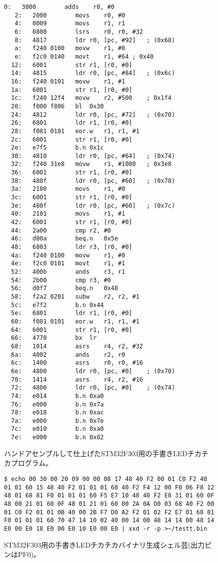 \documentclass[uplatex]{jsarticle}
\begin{document}
\begin{figure}[H]
\begin{lstlisting}[style=armasm]
   0:	3000      	adds	r0, #0
   2:	2000      	movs	r0, #0
   4:	0009      	movs	r1, r1
   6:	0800      	lsrs	r0, r0, #32
   8:	4817      	ldr	r0, [pc, #92]	; (0x68)
   a:	f240 0100 	movw	r1, #0
   e:	f2c0 0140 	movt	r1, #64	; 0x40
  12:	6001      	str	r1, [r0, #0]
  14:	4815      	ldr	r0, [pc, #84]	; (0x6c)
  16:	f240 0101 	movw	r1, #1
  1a:	6001      	str	r1, [r0, #0]
  1c:	f240 12f4 	movw	r2, #500	; 0x1f4
  20:	f000 f806 	bl	0x30
  24:	4812      	ldr	r0, [pc, #72]	; (0x70)
  26:	6801      	ldr	r1, [r0, #0]
  28:	f081 0101 	eor.w	r1, r1, #1
  2c:	6001      	str	r1, [r0, #0]
  2e:	e7f5      	b.n	0x1c
  30:	4810      	ldr	r0, [pc, #64]	; (0x74)
  32:	f240 31e8 	movw	r1, #1000	; 0x3e8
  36:	6001      	str	r1, [r0, #0]
  38:	480f      	ldr	r0, [pc, #60]	; (0x78)
  3a:	2100      	movs	r1, #0
  3c:	6001      	str	r1, [r0, #0]
  3e:	480f      	ldr	r0, [pc, #60]	; (0x7c)
  40:	2101      	movs	r1, #1
  42:	6001      	str	r1, [r0, #0]
  44:	2a00      	cmp	r2, #0
  46:	d00a      	beq.n	0x5e
  48:	6803      	ldr	r3, [r0, #0]
  4a:	f240 0100 	movw	r1, #0
  4e:	f2c0 0101 	movt	r1, #1
  52:	400b      	ands	r3, r1
  54:	2b00      	cmp	r3, #0
  56:	d0f7      	beq.n	0x48
  58:	f2a2 0201 	subw	r2, r2, #1
  5c:	e7f2      	b.n	0x44
  5e:	6801      	ldr	r1, [r0, #0]
  60:	f081 0101 	eor.w	r1, r1, #1
  64:	6001      	str	r1, [r0, #0]
  66:	4770      	bx	lr
  68:	1014      	asrs	r4, r2, #32
  6a:	4002      	ands	r2, r0
  6c:	1400      	asrs	r0, r0, #16
  6e:	4800      	ldr	r0, [pc, #0]	; (0x70)
  70:	1414      	asrs	r4, r2, #16
  72:	4800      	ldr	r0, [pc, #0]	; (0x74)
  74:	e014      	b.n	0xa0
  76:	e000      	b.n	0x7a
  78:	e018      	b.n	0xac
  7a:	e000      	b.n	0x7e
  7c:	e010      	b.n	0xa0
  7e:	e000      	b.n	0x82
\end{lstlisting}
\caption{ハンドアセンブルして仕上げたSTM32F303用の手書きLEDチカチカプログラム。}
\end{figure}


\begin{figure}[H]
\begin{lstlisting}[style=bash]
$ echo 00 30 00 20 09 00 00 08 17 48 40 F2 00 01 C0 F2 40 01 01 60 15 48 40 F2 01 01 01 60 40 F2 F4 12 00 F0 06 F8 12 48 01 68 81 F0 01 01 01 60 F5 E7 10 48 40 F2 E8 31 01 60 0F 48 00 21 01 60 0F 48 01 21 01 60 00 2A 0A D0 03 68 40 F2 00 01 C0 F2 01 01 0B 40 00 2B F7 D0 A2 F2 01 02 F2 E7 01 68 81 F0 01 01 01 60 70 47 14 10 02 40 00 14 00 48 14 14 00 48 14 E0 00 E0 18 E0 00 E0 10 E0 00 E0 | xxd -r -p >~/testt.bin
\end{lstlisting}
\caption{STM32F303用の手書きLEDチカチカバイナリ生成シェル芸(出力ピンはPF0)。}
\end{figure}
\end{document}
